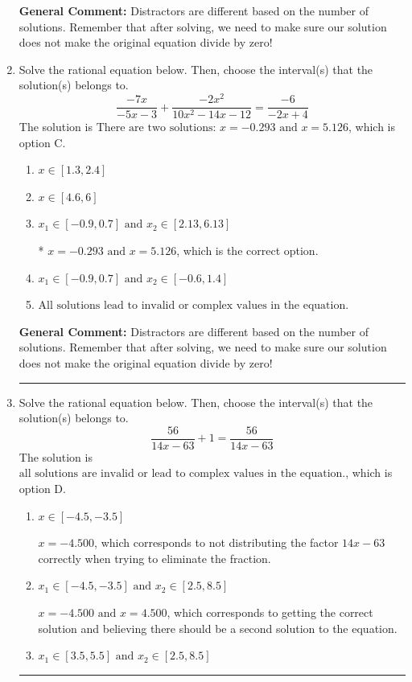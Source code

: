 \documentclass{extbook}[14pt]
\newcommand{\litem}[1]{\item #1

\rule{\textwidth}{0.4pt}}
\begin{document}
\begin{enumerate}
{\textbf{General Comment:} Distractors are different based on the number of solutions. Remember that after solving, we need to make sure our solution does not make the original equation divide by zero!
}
\litem{
Solve the rational equation below. Then, choose the interval(s) that the solution(s) belongs to.
\[ \frac{-7x}{-5x -3} + \frac{-2x^{2}}{10x^{2} -14 x -12} = \frac{-6}{-2x + 4} \]The solution is \( \text{There are two solutions: } x = -0.293 \text{ and } x = 5.126 \), which is option C.\begin{enumerate}[label=\Alph*.]
\item \( x \in [1.3,2.4] \)


\item \( x \in [4.6,6] \)


\item \( x_1 \in [-0.9, 0.7] \text{ and } x_2 \in [2.13,6.13] \)

* $x = -0.293 \text{ and } x = 5.126$, which is the correct option.
\item \( x_1 \in [-0.9, 0.7] \text{ and } x_2 \in [-0.6,1.4] \)


\item \( \text{All solutions lead to invalid or complex values in the equation.} \)


\end{enumerate}

\textbf{General Comment:} Distractors are different based on the number of solutions. Remember that after solving, we need to make sure our solution does not make the original equation divide by zero!
}
\litem{
Solve the rational equation below. Then, choose the interval(s) that the solution(s) belongs to.
\[ \frac{56}{14x -63} + 1 = \frac{56}{14x -63} \]The solution is \( \text{all solutions are invalid or lead to complex values in the equation.} \), which is option D.\begin{enumerate}[label=\Alph*.]
\item \( x \in [-4.5,-3.5] \)

$x = -4.500$, which corresponds to not distributing the factor $14x -63$ correctly when trying to eliminate the fraction.
\item \( x_1 \in [-4.5, -3.5] \text{ and } x_2 \in [2.5,8.5] \)

$x = -4.500 \text{ and } x = 4.500$, which corresponds to getting the correct solution and believing there should be a second solution to the equation.
\item \( x_1 \in [3.5, 5.5] \text{ and } x_2 \in [2.5,8.5] \)


\end{enumerate}}
\end{enumerate}
\end{document}
